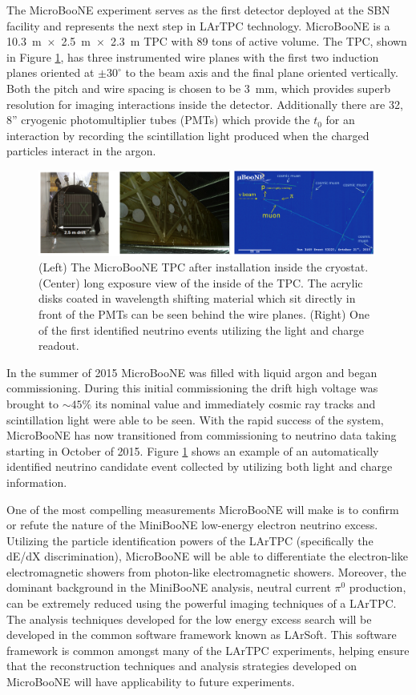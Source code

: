 \label{sec:IF_MicroBooNE}
The MicroBooNE experiment serves as the first detector deployed at the SBN facility and represents the next step in LArTPC technology. MicroBooNE is a 10.3~m~$\times$~2.5~m~$\times$~2.3~m TPC with 89 tons of active volume. The TPC, shown in Figure \ref{fig:uboone}, has three instrumented wire planes with the first two induction planes oriented at $\pm 30^{\circ}$ to the beam axis and the final plane oriented vertically. Both the pitch and wire spacing is chosen to be 3~mm, which provides superb resolution for imaging interactions inside the detector. Additionally there are 32, 8'' cryogenic photomultiplier tubes (PMTs) which provide the $t_{0}$ for an interaction by recording the scintillation light produced when the charged particles interact in the argon.

\begin{figure}[htb]
\centering
\includegraphics[width=0.99\textwidth]{images/uboone.png}
\caption[]{(Left) The MicroBooNE TPC after installation inside the cryostat. (Center) long exposure view of the inside of the TPC. The acrylic disks coated in wavelength shifting material which sit directly in front of the PMTs can be seen behind the wire planes. (Right) One of the first identified neutrino events utilizing the light and charge readout.}
\label{fig:uboone}
\end{figure}

In the summer of 2015 MicroBooNE was filled with liquid argon and began commissioning. During this initial commissioning the drift high voltage was brought to $\sim 45\%$ its nominal value and immediately cosmic ray tracks and scintillation light were able to be seen. With the rapid success of the system, MicroBooNE has now transitioned from commissioning to neutrino data taking starting in October of 2015. Figure \ref{fig:uboone} shows an example of an automatically identified neutrino candidate event collected by utilizing both light and charge information. 

One of the most compelling measurements MicroBooNE will make is to confirm or refute the nature of the MiniBooNE low-energy electron neutrino excess. Utilizing the particle identification powers of the LArTPC (specifically the dE/dX discrimination), MicroBooNE will be able to differentiate the electron-like electromagnetic showers from photon-like electromagnetic showers. Moreover, the dominant background in the MiniBooNE analysis, neutral current $\pi^{0}$ production, can be extremely reduced using the powerful imaging techniques of a LArTPC. The analysis techniques developed for the low energy excess search will be developed in the common software framework known as LArSoft. This software framework is common amongst many of the LArTPC experiments, helping ensure that the reconstruction techniques and analysis strategies developed on MicroBooNE will have applicability to future experiments.

